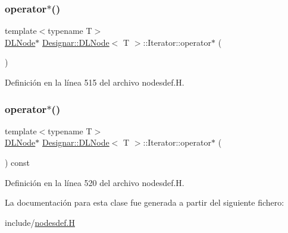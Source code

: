 \subsubsection{\texorpdfstring{operator$\ast$()}{operator*()}\hspace{0.1cm}{\footnotesize\ttfamily [1/2]}}
{\footnotesize\ttfamily template$<$typename T$>$ \\
\hyperlink{class_designar_1_1_d_l_node}{D\+L\+Node}$\ast$ \hyperlink{class_designar_1_1_d_l_node}{Designar\+::\+D\+L\+Node}$<$ T $>$\+::Iterator\+::operator$\ast$ (\begin{DoxyParamCaption}{ }\end{DoxyParamCaption})\hspace{0.3cm}{\ttfamily [inline]}}



Definición en la línea 515 del archivo nodesdef.\+H.

\mbox{\label{class_designar_1_1_d_l_node_1_1_iterator_ae75896ae631f91daaaa9a193df27a239}} 
\subsubsection{\texorpdfstring{operator$\ast$()}{operator*()}\hspace{0.1cm}{\footnotesize\ttfamily [2/2]}}
{\footnotesize\ttfamily template$<$typename T$>$ \\
\hyperlink{class_designar_1_1_d_l_node}{D\+L\+Node}$\ast$ \hyperlink{class_designar_1_1_d_l_node}{Designar\+::\+D\+L\+Node}$<$ T $>$\+::Iterator\+::operator$\ast$ (\begin{DoxyParamCaption}{ }\end{DoxyParamCaption}) const\hspace{0.3cm}{\ttfamily [inline]}}



Definición en la línea 520 del archivo nodesdef.\+H.



La documentación para esta clase fue generada a partir del siguiente fichero\+:\begin{DoxyCompactItemize}
\item 
include/\hyperlink{nodesdef_8_h}{nodesdef.\+H}\end{DoxyCompactItemize}
